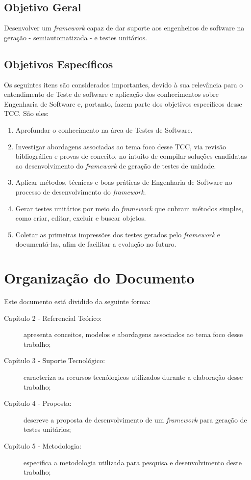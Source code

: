     \subsection{Objetivo Geral}
    Desenvolver um \textit{framework} capaz de dar suporte aos engenheiros de software na geração - semiautomatizada - e testes unitários.
    
    \subsection{Objetivos Específicos}
    Os seguintes itens são considerados importantes, devido à sua relevância para o entendimento de Teste de software e aplicação dos conhecimentos sobre Engenharia de Software e, portanto, fazem parte dos objetivos específicos desse TCC. São eles:

    \begin{enumerate}
      \item Aprofundar o conhecimento na área de Testes de Software.
      
      \item Investigar abordagens associadas ao tema foco desse TCC, via revisão bibliográfica e provas de conceito, no intuito de compilar soluções candidatas ao desenvolvimento do \textit{framework} de geração de testes de unidade.
      
      \item Aplicar métodos, técnicas e boas práticas de Engenharia de Software no processo de desenvolvimento do \textit{framework}.
      
      \item Gerar testes unitários por meio do \textit{framework} que cubram métodos simples, como criar, editar, excluir e buscar objetos.

      \item Coletar as primeiras impressões dos testes gerados pelo \textit{framework} e documentá-las, afim de facilitar a evolução no futuro.

    \end{enumerate}
    
\section{Organização do Documento}
	Este documento está dividido da seguinte forma:
	
	\begin{description}
		\item[Capítulo 2 - Referencial Teórico:] apresenta conceitos, modelos e abordagens associados ao tema foco desse trabalho;
		\item[Capítulo 3 - Suporte Tecnológico:] caracteriza as recursos tecnólogicos utilizados durante a elaboração desse trabalho;
		\item[Capítulo 4 - Proposta:] descreve a proposta de desenvolvimento de um \textit{framework} para geração de testes unitários;
		\item[Capítulo 5 - Metodologia:] especifica a metodologia utilizada para pesquisa e desenvolvimento deste trabalho;
	\end{description}